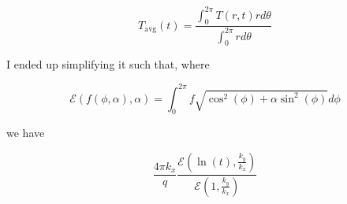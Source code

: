 \begin{equation}
T_{\textrm{avg}}(t) = \frac{ \int_0^{2\pi} T(r,t) rd\theta }
                           { \int_0^{2\pi} rd\theta}
\end{equation}

I ended up simplifying it such that, where

\begin{equation}
\mathcal{E}(f(\phi, \alpha), \alpha) = \int_0^{2\pi} f\sqrt{\cos^2(\phi) + \alpha\sin^2(\phi)} d\phi
\end{equation}

we have

\begin{equation}
\frac{4\pi k_x}{q} \frac{\mathcal{E}(\ln(t), \frac{k_y}{k_x})}{\mathcal{E}(1, \frac{k_y}{k_x})}
\end{equation}


